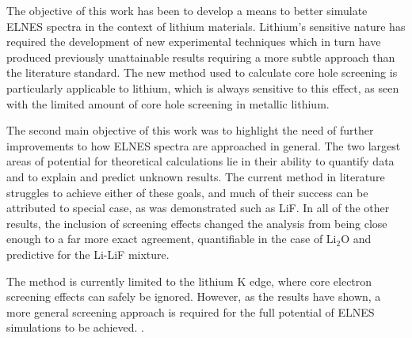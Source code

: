 
The objective of this work has been to develop a means to better simulate ELNES spectra in the context of lithium materials.  Lithium's sensitive nature has required the development of new experimental techniques which in turn have produced previously unattainable results requiring a more subtle approach than the literature standard.  The new method used to calculate core hole screening is particularly applicable to lithium, which is always sensitive to this effect, as seen with the limited amount of core hole screening in metallic lithium.  

The second main objective of this work was to highlight the need of further improvements to how ELNES spectra are approached in general.  The two largest areas of potential for theoretical calculations lie in their ability to quantify data and to explain and predict unknown results.  The current method in literature struggles to achieve either of these goals, and much of their success can be attributed to special case, as was demonstrated such as LiF.  In all of the other results, the inclusion of screening effects changed the analysis from being close enough to a far more exact agreement, quantifiable in the case of $ \mathrm{Li_2O}$ and predictive for the Li-LiF mixture.  

The method is currently limited to the lithium K edge, where core electron screening effects can safely be ignored.  However, as the results have shown, a more general screening approach is required for the full potential of ELNES simulations to be achieved.  .
